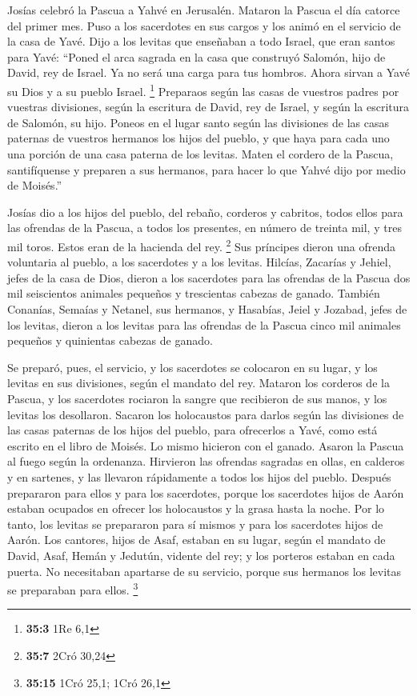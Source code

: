  Josías celebró la Pascua a Yahvé en Jerusalén. Mataron la
Pascua el día catorce del primer mes.  Puso a los
sacerdotes en sus cargos y los animó en el servicio de la casa de Yavé.
 Dijo a los levitas que enseñaban a todo Israel, que eran
santos para Yavé: ``Poned el arca sagrada en la casa que construyó
Salomón, hijo de David, rey de Israel. Ya no será una carga para tus
hombros. Ahora sirvan a Yavé su Dios y a su pueblo Israel. \footnote{\textbf{35:3}
  1Re 6,1}  Preparaos según las casas de vuestros padres
por vuestras divisiones, según la escritura de David, rey de Israel, y
según la escritura de Salomón, su hijo.  Poneos en el
lugar santo según las divisiones de las casas paternas de vuestros
hermanos los hijos del pueblo, y que haya para cada uno una porción de
una casa paterna de los levitas.  Maten el cordero de la
Pascua, santifíquense y preparen a sus hermanos, para hacer lo que Yahvé
dijo por medio de Moisés.''

 Josías dio a los hijos del pueblo, del rebaño, corderos y
cabritos, todos ellos para las ofrendas de la Pascua, a todos los
presentes, en número de treinta mil, y tres mil toros. Estos eran de la
hacienda del rey. \footnote{\textbf{35:7} 2Cró 30,24}  Sus
príncipes dieron una ofrenda voluntaria al pueblo, a los sacerdotes y a
los levitas. Hilcías, Zacarías y Jehiel, jefes de la casa de Dios,
dieron a los sacerdotes para las ofrendas de la Pascua dos mil
seiscientos animales pequeños y trescientas cabezas de ganado.
 También Conanías, Semaías y Netanel, sus hermanos, y
Hasabías, Jeiel y Jozabad, jefes de los levitas, dieron a los levitas
para las ofrendas de la Pascua cinco mil animales pequeños y quinientas
cabezas de ganado.

 Se preparó, pues, el servicio, y los sacerdotes se
colocaron en su lugar, y los levitas en sus divisiones, según el mandato
del rey.  Mataron los corderos de la Pascua, y los
sacerdotes rociaron la sangre que recibieron de sus manos, y los levitas
los desollaron.  Sacaron los holocaustos para darlos
según las divisiones de las casas paternas de los hijos del pueblo, para
ofrecerlos a Yavé, como está escrito en el libro de Moisés. Lo mismo
hicieron con el ganado.  Asaron la Pascua al fuego según
la ordenanza. Hirvieron las ofrendas sagradas en ollas, en calderos y en
sartenes, y las llevaron rápidamente a todos los hijos del pueblo.
 Después prepararon para ellos y para los sacerdotes,
porque los sacerdotes hijos de Aarón estaban ocupados en ofrecer los
holocaustos y la grasa hasta la noche. Por lo tanto, los levitas se
prepararon para sí mismos y para los sacerdotes hijos de Aarón.
 Los cantores, hijos de Asaf, estaban en su lugar, según
el mandato de David, Asaf, Hemán y Jedutún, vidente del rey; y los
porteros estaban en cada puerta. No necesitaban apartarse de su
servicio, porque sus hermanos los levitas se preparaban para ellos.
\footnote{\textbf{35:15} 1Cró 25,1; 1Cró 26,1}

